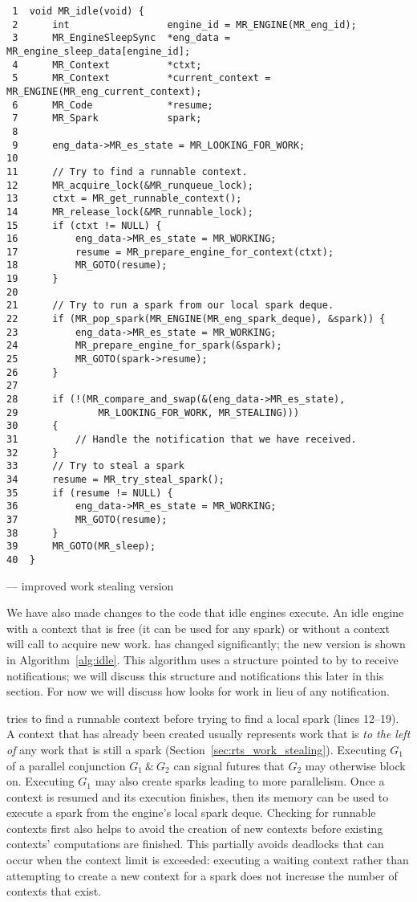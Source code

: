 \begin{algorithm}[tbp]
\begin{verbatim}
 1  void MR_idle(void) {
 2      int                 engine_id = MR_ENGINE(MR_eng_id);
 3      MR_EngineSleepSync  *eng_data = MR_engine_sleep_data[engine_id];
 4      MR_Context          *ctxt;
 5      MR_Context          *current_context = MR_ENGINE(MR_eng_current_context);
 6      MR_Code             *resume;
 7      MR_Spark            spark;
 8
 9      eng_data->MR_es_state = MR_LOOKING_FOR_WORK;
10
11      // Try to find a runnable context.
12      MR_acquire_lock(&MR_runqueue_lock);
13      ctxt = MR_get_runnable_context();
14      MR_release_lock(&MR_runnable_lock);
15      if (ctxt != NULL) {
16          eng_data->MR_es_state = MR_WORKING;
17          resume = MR_prepare_engine_for_context(ctxt);
18          MR_GOTO(resume);
19      }
20
21      // Try to run a spark from our local spark deque.
22      if (MR_pop_spark(MR_ENGINE(MR_eng_spark_deque), &spark)) {
23          eng_data->MR_es_state = MR_WORKING;
24          MR_prepare_engine_for_spark(&spark);
25          MR_GOTO(spark->resume);
26      }
27
28      if (!(MR_compare_and_swap(&(eng_data->MR_es_state),
29              MR_LOOKING_FOR_WORK, MR_STEALING)))
30      {
31          // Handle the notification that we have received.
32      }
33      // Try to steal a spark
34      resume = MR_try_steal_spark();
35      if (resume != NULL) {
36          eng_data->MR_es_state = MR_WORKING;
37          MR_GOTO(resume);
38      }
39      MR_GOTO(MR_sleep);
40  }
\end{verbatim}
\caption{\idle --- improved work stealing version}
\label{alg:idle}
\end{algorithm}

We have also made changes to the code that idle engines execute.
An idle engine with a context that is free (it can be used for any spark) or
without a context will call \idle to acquire new work.
\idle has changed significantly;
the new version is shown in Algorithm~\ref{alg:idle}.
This algorithm uses a structure pointed to by  to receive
notifications;
we will discuss this structure and notifications this later in this section.
For now we will discuss how \idle looks for work in lieu of any notification.

\idle tries to find a runnable context before trying to find a local
spark (lines 12--19).
A context that has already been created usually represents work that is
\emph{to the left of}
any work that is still a spark (Section~\ref{sec:rts_work_stealing}).
Executing $G_1$ of a parallel conjunction $G_1~\&~G_2$ can signal futures
that $G_2$ may otherwise block on.
Executing $G_1$ may also create sparks leading to more parallelism.
Once a context is resumed and its execution finishes,
then its memory can be used to execute a spark from the engine's local spark
deque.
Checking for runnable contexts first also helps to avoid the creation of new
contexts before existing contexts' computations are finished.
This partially avoids deadlocks that can occur when the context limit is
exceeded:
executing a waiting context rather than attempting to create a new context
for a spark does not increase the number of contexts that exist.

